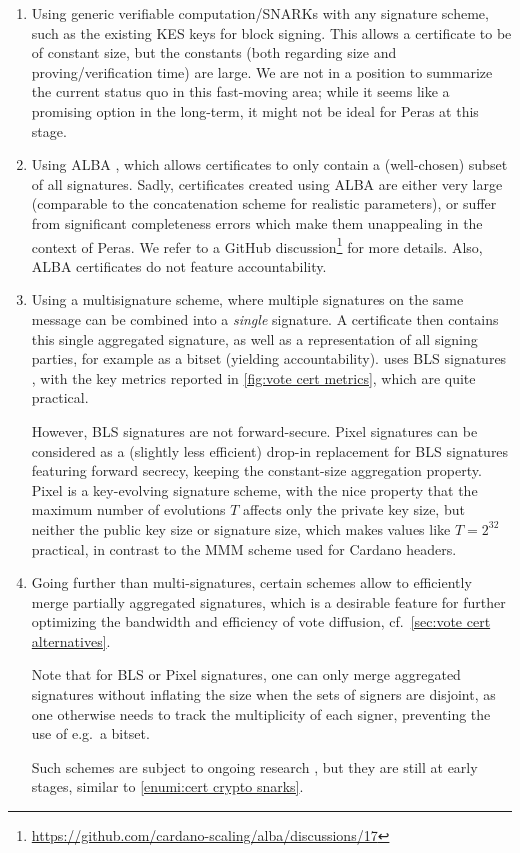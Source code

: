 \begin{enumerate}
\item\label{enumi:cert crypto snarks}
  Using generic verifiable computation/SNARKs with any signature scheme, such as the existing KES keys for block signing.
  This allows a certificate to be of constant size, but the constants (both regarding size and proving/verification time) are large.
  We are not in a position to summarize the current status quo in this fast-moving area; while it seems like a promising option in the long-term, it might not be ideal for Peras at this stage.
\item
  Using ALBA \parencite{chaidos2024approximate}, which allows certificates to only contain a (well-chosen) subset of all signatures.
  Sadly, certificates created using ALBA are either very large (comparable to the concatenation scheme for realistic parameters), or suffer from significant completeness errors which make them unappealing in the context of Peras.
  We refer to a GitHub discussion\footnote{\url{https://github.com/cardano-scaling/alba/discussions/17}} for more details.
  Also, ALBA certificates do not feature accountability.
\item
  Using a multisignature scheme, where multiple signatures on the same message can be combined into a \emph{single} signature.
  A certificate then contains this single aggregated signature, as well as a representation of all signing parties, for example as a bitset (yielding accountability).
  \Cite{peras-cert-report} uses BLS signatures \parencite{boneh2004short}, with the key metrics reported in \cref{fig:vote cert metrics}, which are quite practical.

  However, BLS signatures are not forward-secure.
  Pixel signatures \parencite{drijvers2020pixel} can be considered as a (slightly less efficient) drop-in replacement for BLS signatures featuring forward secrecy, keeping the constant-size aggregation property.
  Pixel is a key-evolving signature scheme, with the nice property that the maximum number of evolutions $T$ affects only the private key size, but neither the public key size or signature size, which makes values like $T = 2^{32}$ practical, in contrast to the MMM scheme \parencite{malkin2001composition} used for Cardano headers.
\item
  Going further than multi-signatures, certain schemes allow to efficiently merge partially aggregated signatures, which is a desirable feature for further optimizing the bandwidth and efficiency of vote diffusion, cf.\ \cref{sec:vote cert alternatives}.

  Note that for BLS or Pixel signatures, one can only merge aggregated signatures without inflating the size when the sets of signers are disjoint, as one otherwise needs to track the multiplicity of each signer, preventing the use of e.g.\ a bitset.

  Such schemes are subject to ongoing research \parencite{signature-merging,cryptoeprint:2025/144}, but they are still at early stages, similar to \ref{enumi:cert crypto snarks}.
\end{enumerate}

